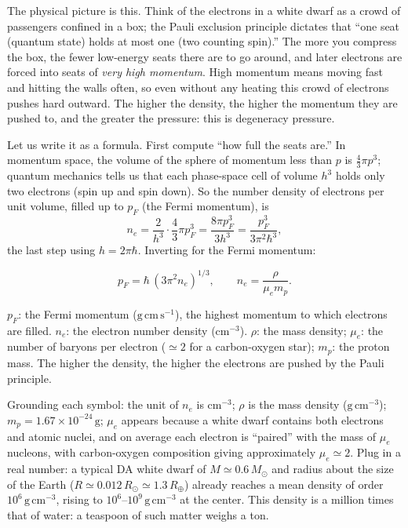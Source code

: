 The physical picture is this. Think of the electrons in a white dwarf as a crowd of passengers confined in a box; the Pauli exclusion principle dictates that ``one seat (quantum state) holds at most one (two counting spin).'' The more you compress the box, the fewer low-energy seats there are to go around, and later electrons are forced into seats of \emph{very high momentum}. High momentum means moving fast and hitting the walls often, so even without any heating this crowd of electrons pushes hard outward. The higher the density, the higher the momentum they are pushed to, and the greater the pressure: this is degeneracy pressure.

Let us write it as a formula. First compute ``how full the seats are.'' In momentum space, the volume of the sphere of momentum less than \(p\) is \(\tfrac{4}{3}\pi p^3\); quantum mechanics tells us that each phase-space cell of volume \(h^3\) holds only two electrons (spin up and spin down). So the number density of electrons per unit volume, filled up to \(p_F\) (the Fermi momentum), is
\[
  n_e=\frac{2}{h^3}\cdot\frac{4}{3}\pi p_F^3
     =\frac{8\pi p_F^3}{3h^3}
     =\frac{p_F^3}{3\pi^2\hbar^3},
\]
the last step using \(h=2\pi\hbar\). Inverting for the Fermi momentum:

\begin{equation}
  p_F=\hbar\,(3\pi^2 n_e)^{1/3},
  \qquad
  n_e=\frac{\rho}{\mu_e m_p}.
  \label{eq:e18-fermi}
\end{equation}
\begin{formulaexplain}
\(p_F\): the Fermi momentum (\(\mathrm{g\,cm\,s^{-1}}\)), the highest momentum to which electrons are filled. \(n_e\): the electron number density (\(\mathrm{cm^{-3}}\)). \(\rho\): the mass density; \(\mu_e\): the number of baryons per electron (\(\simeq2\) for a carbon-oxygen star); \(m_p\): the proton mass. The higher the density, the higher the electrons are pushed by the Pauli principle.
\end{formulaexplain}

Grounding each symbol: the unit of \(n_e\) is \(\mathrm{cm^{-3}}\); \(\rho\) is the mass density (\(\mathrm{g\,cm^{-3}}\)); \(m_p=1.67\times10^{-24}\,\mathrm{g}\); \(\mu_e\) appears because a white dwarf contains both electrons and atomic nuclei, and on average each electron is ``paired'' with the mass of \(\mu_e\) nucleons, with carbon-oxygen composition giving approximately \(\mu_e\simeq2\). Plug in a real number: a typical DA white dwarf of \(M\simeq0.6\,M_\odot\) and radius about the size of the Earth (\(R\simeq0.012\,R_\odot\simeq1.3\,R_\oplus\)) already reaches a mean density of order \(10^6\,\mathrm{g\,cm^{-3}}\), rising to \(10^6\)--\(10^9\,\mathrm{g\,cm^{-3}}\) at the center. This density is a million times that of water: a teaspoon of such matter weighs a ton.


